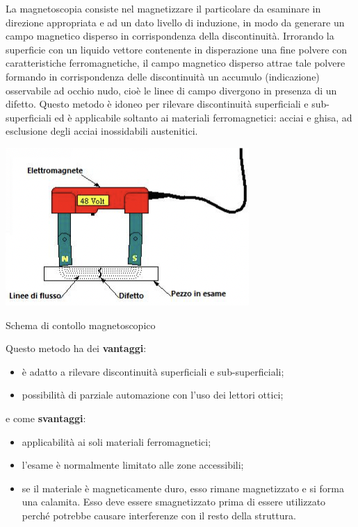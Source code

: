 La magnetoscopia consiste nel magnetizzare il particolare da esaminare in direzione appropriata e ad un dato livello di induzione, in modo da generare
un campo magnetico disperso in corrispondenza della discontinuità. Irrorando la superficie con un liquido vettore contenente in disperazione una fine polvere con caratteristiche ferromagnetiche, il campo magnetico disperso attrae tale polvere formando in corrispondenza delle discontinuità un accumulo (indicazione) osservabile ad occhio nudo, cioè le linee di campo divergono in presenza di un difetto. Questo metodo è idoneo per rilevare discontinuità superficiali e sub-superficiali ed è applicabile soltanto ai materiali ferromagnetici: acciai e ghisa, ad esclusione degli acciai inossidabili austenitici. 
\begin{marginfigure}[-4cm]
\includegraphics{images/img14.png}
\caption{Schema di contollo magnetoscopico}
\end{marginfigure}

Questo metodo ha dei \textbf{vantaggi}:
\begin{itemize}
    \item è adatto a rilevare discontinuità superficiali e sub-superficiali;
    \item possibilità di parziale automazione con l’uso dei lettori ottici;
\end{itemize}

e come \textbf{svantaggi}:
\begin{itemize}
    \item applicabilità ai soli materiali ferromagnetici;
    \item l’esame è normalmente limitato alle zone accessibili;
    \item se il materiale è magneticamente duro, esso rimane magnetizzato e si forma una calamita. Esso deve essere smagnetizzato prima di essere utilizzato perché potrebbe causare interferenze con il resto della struttura.
\end{itemize}

